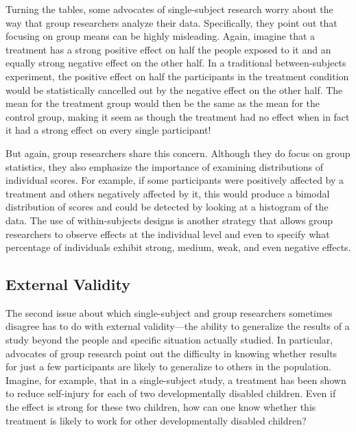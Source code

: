  Turning the tables, some advocates of single-subject research worry about the way that group researchers analyze their data. Specifically, they point out that focusing on group means can be highly misleading. Again, imagine that a treatment has a strong positive effect on half the people exposed to it and an equally strong negative effect on the other half. In a traditional between-subjects experiment, the positive effect on half the participants in the treatment condition would be statistically cancelled out by the negative effect on the other half. The mean for the treatment group would then be the same as the mean for the control group, making it seem as though the treatment had no effect when in fact it had a strong effect on every single participant!
 
 But again, group researchers share this concern. Although they do focus on group statistics, they also emphasize the importance of examining distributions of individual scores. For example, if some participants were positively affected by a treatment and others negatively affected by it, this would produce a bimodal distribution of scores and could be detected by looking at a histogram of the data. The use of within-subjects designs is another strategy that allows group researchers to observe effects at the individual level and even to specify what percentage of individuals exhibit strong, medium, weak, and even negative effects.
 
 \subsection{External Validity}
 
 The second issue about which single-subject and group researchers sometimes disagree has to do with external validity---the ability to generalize the results of a study beyond the people and specific situation actually studied. In particular, advocates of group research point out the difficulty in knowing whether results for just a few participants are likely to generalize to others in the population. Imagine, for example, that in a single-subject study, a treatment has been shown to reduce self-injury for each of two developmentally disabled children. Even if the effect is strong for these two children, how can one know whether this treatment is likely to work for other developmentally disabled children?
 
